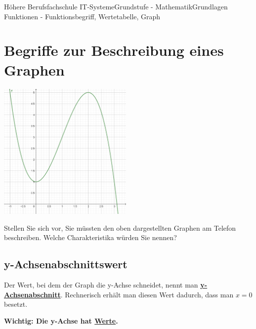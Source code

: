 \documentclass[11pt,twocolumn,oneside,openany,headings=optiontotoc,11pt,numbers=noenddot]{article}
\begin{document}
	\begin{worksheet}{Höhere Berufsfachschule IT-Systeme}{Grundstufe - Mathematik}{Grundlagen Funktionen - Funktionsbegriff, Wertetabelle, Graph}
		\setcounter{section}{7}
		\section{Begriffe zur Beschreibung eines Graphen}
		\includegraphics[width=0.49\textwidth]{../99_Bilder/basicsBsp.png}\\
		\par\bigskip\noindent
		Stellen Sie sich vor, Sie müssten den oben dargestellten Graphen am Telefon beschreiben. Welche Charakteristika würden Sie nennen?
		\subsection*{y-Achsenabschnittswert}
		Der Wert, bei dem der Graph die y-Achse schneidet, nennt man \textbf{\underline{y-Achsenabschnitt}}. Rechnerisch erhält man diesen Wert dadurch, dass man \(x= 0\) besetzt.\\
		\par\bigskip\noindent
		\textbf{Wichtig: Die y-Achse hat \underline{Werte}.}

\end{worksheet}
\end{document}
